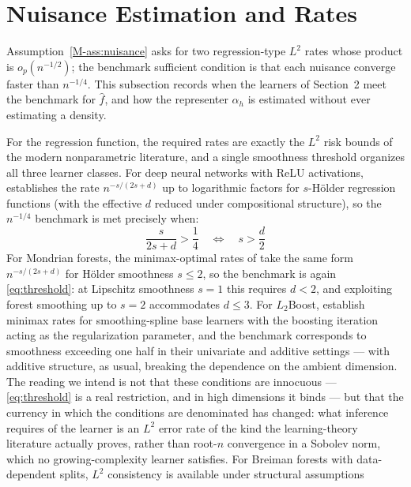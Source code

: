 \documentclass[12pt,a4paper]{article}
\numberwithin{equation}{section}
\theoremstyle{plain}
\theoremstyle{definition}
\begin{document}
	\section{Nuisance Estimation and Rates}
	\label{sec:rates}
	
	Assumption~\ref{M-ass:nuisance} asks for two regression-type $L^2$ rates whose
	product is $o_p(n^{-1/2})$; the benchmark sufficient condition is that each
	nuisance converge faster than $n^{-1/4}$. This subsection records when the
	learners of Section~2 meet the benchmark for $\hat{f}$, and how the representer
	$\alpha_h$ is estimated without ever estimating a density.
	
	For the regression function, the required rates are exactly the $L^2$ risk bounds
	of the modern nonparametric literature, and a single smoothness threshold
	organizes all three learner classes. For deep neural networks with ReLU
	activations, \citet{schmidthieber2020} establishes the rate
	$n^{-s/(2s + d)}$ up to logarithmic factors for $s$-H\"{o}lder regression
	functions (with the effective $d$ reduced under compositional structure), so the
	$n^{-1/4}$ benchmark is met precisely when:
	\begin{equation}
		\frac{s}{2s + d} > \frac{1}{4}
		\quad \Longleftrightarrow \quad
		s > \frac{d}{2}
		\label{eq:threshold}
	\end{equation}
	For Mondrian forests, the minimax-optimal rates of \citet{mourtada2017mondrian}
	take the same form $n^{-s/(2s + d)}$ for H\"{o}lder smoothness $s \leq 2$, so the
	benchmark is again \eqref{eq:threshold}: at Lipschitz smoothness $s = 1$ this
	requires $d < 2$, and exploiting forest smoothing up to $s = 2$ accommodates
	$d \leq 3$. For $L_2$Boost, \citet{buhlmann2003boosting} establish minimax rates
	for smoothing-spline base learners with the boosting iteration acting as the
	regularization parameter, and the benchmark corresponds to smoothness exceeding
	one half in their univariate and additive settings --- with additive structure,
	as usual, breaking the dependence on the ambient dimension. The reading we intend
	is not that these conditions are innocuous --- \eqref{eq:threshold} is a real
	restriction, and in high dimensions it binds --- but that the currency in which
	the conditions are denominated has changed: what inference requires of the learner
	is an $L^2$ error rate of the kind the learning-theory literature actually
	proves, rather than root-$n$ convergence in a Sobolev norm, which no
	growing-complexity learner satisfies. For Breiman forests with data-dependent
	splits, $L^2$ consistency is available under structural assumptions
\end{document}
